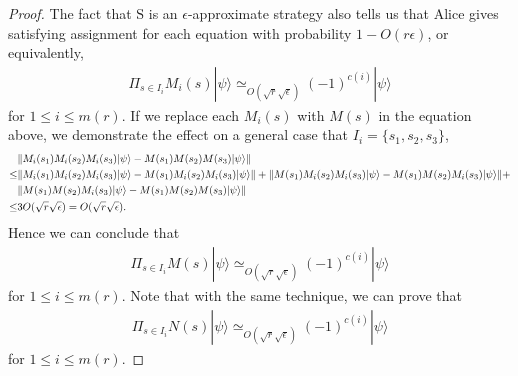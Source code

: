 \documentclass[11pt,letterpaper]{article}
\newcommand{\ket}[1]{|#1\rangle}
\DeclarePairedDelimiter{\norm}{\lVert}{\rVert}
\newcommand{\1}{\mathbb{1}}
\newcommand{\mr}{m(r)}
\newcommand{\bS}{\mathrm{S}}
\newcommand{\ep}{\epsilon}
\newcommand{\se}{\sqrt{\epsilon}}
\newcommand{\sr}{\sqrt{r}}
\newcommand{\appd}[1]{\simeq_{#1}}
\theoremstyle{definition}
\begin{document}
\begin{proof}
The fact that $\bS$ is an $\ep$-approximate strategy also tells us that
Alice gives satisfying assignment for each equation with probability $1 - O(r\ep)$,
or equivalently,
\begin{align*}
	\Pi_{s \in I_i} M_{i}(s) \ket{\psi} \appd{O(\sr\se)} (-1)^{c(i)} \ket{\psi}
\end{align*}
for $1 \leq i \leq \mr$.
If we replace each $M_{i}(s)$ with $M(s)$ in the equation above, we demonstrate the effect on a
general case that $I_i = \{s_1, s_2, s_3\}$,
\begin{align*}
	&\norm{ M_{i}(s_1)M_{i}(s_2)M_{i}(s_3) \ket{\psi} - M(s_1)M(s_2)M(s_3) \ket{\psi}}\\
	\leq & \norm{M_{i}(s_1)M_{i}(s_2)M_{i}(s_3)\ket{\psi} - M(s_1)M_{i}(s_2)M_{i}(s_3) \ket{\psi}}+
	\norm{M(s_1)M_{i}(s_2)M_{i}(s_3) \ket{\psi} - M(s_1)M(s_2)M_{i}(s_3) \ket{\psi}} +\\
	&\norm{M(s_1)M(s_2)M_{i}(s_3) \ket{\psi} - M(s_1)M(s_2)M(s_3) \ket{\psi}}\\
	\leq &3O(\sr\se) = O(\sr\se).
\end{align*}
Hence we can conclude that 
\begin{align*}
	\Pi_{s \in I_i} M(s) \ket{\psi} \appd{O(\sr\se)} (-1)^{c(i)}\ket{\psi}
\end{align*}
for $1 \leq i \leq \mr$.
Note that with the same technique, we can prove that 
\begin{align*}
	\Pi_{s \in I_i} N(s) \ket{\psi} \appd{O(\sr\se)} (-1)^{c(i)}\ket{\psi}  
\end{align*}
for $1 \leq i \leq \mr$.
\end{proof}
\end{document}
